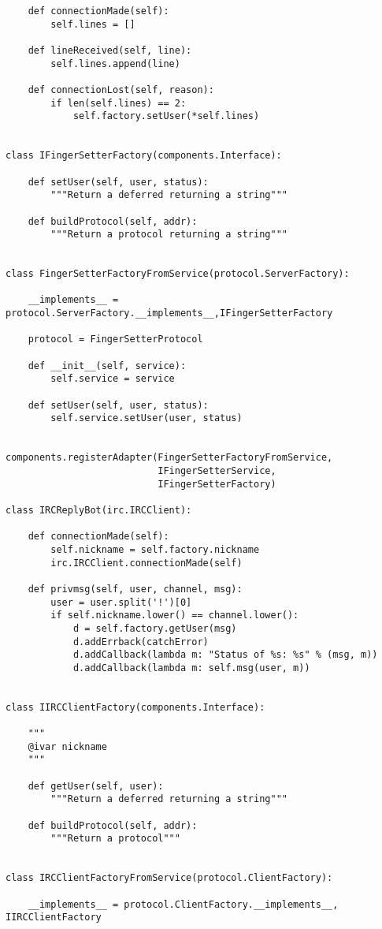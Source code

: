 \begin{verbatim}
    def connectionMade(self):
        self.lines = []

    def lineReceived(self, line):
        self.lines.append(line)

    def connectionLost(self, reason):
        if len(self.lines) == 2:
            self.factory.setUser(*self.lines)


class IFingerSetterFactory(components.Interface):

    def setUser(self, user, status):
        """Return a deferred returning a string"""

    def buildProtocol(self, addr):
        """Return a protocol returning a string"""


class FingerSetterFactoryFromService(protocol.ServerFactory):

    __implements__ = protocol.ServerFactory.__implements__,IFingerSetterFactory

    protocol = FingerSetterProtocol

    def __init__(self, service):
        self.service = service

    def setUser(self, user, status):
        self.service.setUser(user, status)


components.registerAdapter(FingerSetterFactoryFromService,
                           IFingerSetterService,
                           IFingerSetterFactory)

class IRCReplyBot(irc.IRCClient):

    def connectionMade(self):
        self.nickname = self.factory.nickname
        irc.IRCClient.connectionMade(self)

    def privmsg(self, user, channel, msg):
        user = user.split('!')[0]
        if self.nickname.lower() == channel.lower():
            d = self.factory.getUser(msg)
            d.addErrback(catchError)
            d.addCallback(lambda m: "Status of %s: %s" % (msg, m))
            d.addCallback(lambda m: self.msg(user, m))


class IIRCClientFactory(components.Interface):

    """
    @ivar nickname
    """

    def getUser(self, user):
        """Return a deferred returning a string"""

    def buildProtocol(self, addr):
        """Return a protocol"""


class IRCClientFactoryFromService(protocol.ClientFactory):

    __implements__ = protocol.ClientFactory.__implements__, IIRCClientFactory


\end{verbatim}
